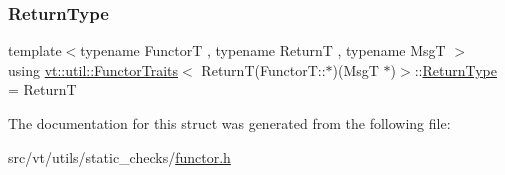 \subsubsection{\texorpdfstring{Return\+Type}{ReturnType}}
{\footnotesize\ttfamily template$<$typename FunctorT , typename ReturnT , typename MsgT $>$ \\
using \hyperlink{structvt_1_1util_1_1_functor_traits}{vt\+::util\+::\+Functor\+Traits}$<$ ReturnT(Functor\+T\+::$\ast$)(MsgT $\ast$)$>$\+::\hyperlink{structvt_1_1util_1_1_functor_traits_3_01_return_t_07_functor_t_1_1_5_08_07_msg_t_01_5_08_4_a3e7f89c39566d8908ee4704df4e94faf}{Return\+Type} =  ReturnT}



The documentation for this struct was generated from the following file\+:\begin{DoxyCompactItemize}
\item 
src/vt/utils/static\+\_\+checks/\hyperlink{functor_8h}{functor.\+h}\end{DoxyCompactItemize}
